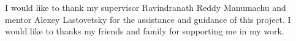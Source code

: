 I would like to thank my supervisor Ravindranath Reddy Manumachu and mentor Alexey Lastovetsky for the assistance and guidance of this project. I would like to thanks my friends and family for supporting me in my work.